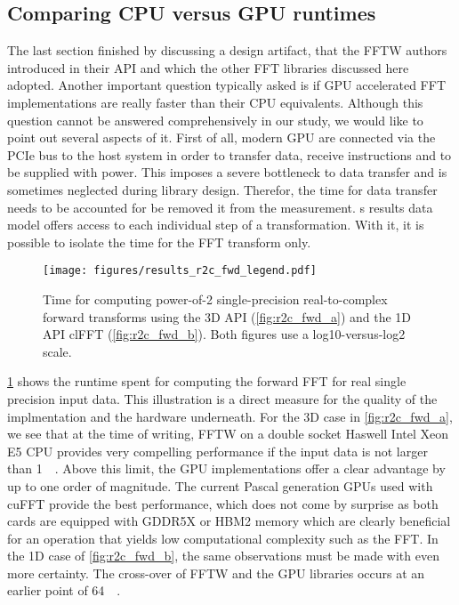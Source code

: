 \newpage
\subsection{Comparing CPU versus GPU runtimes}
\label{ssec:cpu_vs_gpu}

The last section finished by discussing a design artifact, that the FFTW authors introduced in their API and which the other FFT libraries discussed here adopted. Another important question typically asked is if GPU accelerated FFT implementations are really faster than their CPU equivalents. Although this question cannot be answered comprehensively in our study, we would like to point out several aspects of it. First of all, modern GPU are connected via the PCIe bus to the host system in order to transfer data, receive instructions and to be supplied with power. This imposes a severe bottleneck to data transfer and is sometimes neglected during library design. Therefor, the time for data transfer needs to be accounted for be removed it from the measurement. \gearshifft{}s results data model offers access to each individual step of a transformation. With it, it is possible to isolate the time for the FFT transform only.

\begin{figure}[!tbp]
  \centering
  \texttt{[image: figures/results\_r2c\_fwd\_legend.pdf]}\vspace{-1em}
  \hfill
  \caption{Time for computing power-of-2 single-precision real-to-complex forward transforms using the 3D API (\cref{fig:r2c_fwd_a}) and the 1D API clFFT (\cref{fig:r2c_fwd_b}). Both figures use a log10-versus-log2 scale.}
  \label{fig:r2c_fwd}
\end{figure}

\cref{fig:r2c_fwd} shows the runtime spent for computing the forward FFT for real single precision input data. This illustration is a direct measure for the quality of the implmentation and the hardware underneath. For the 3D case in \cref{fig:r2c_fwd_a}, we see that at the time of writing, FFTW on a double socket Haswell Intel Xeon E5 CPU provides very compelling performance if the input data is not larger than \SI{1}{\mebi\byte}. Above this limit, the GPU implementations offer a clear advantage by up to one order of magnitude. The current Pascal generation GPUs used with cuFFT provide the best performance, which does not come by surprise as both cards are equipped with GDDR5X or HBM2 memory which are clearly beneficial for an operation that yields low computational complexity such as the FFT. In the 1D case of \cref{fig:r2c_fwd_b}, the same observations must be made with even more certainty. The cross-over of FFTW and the GPU libraries occurs at an earlier point of \SI{64}{\kibi\byte}.  

